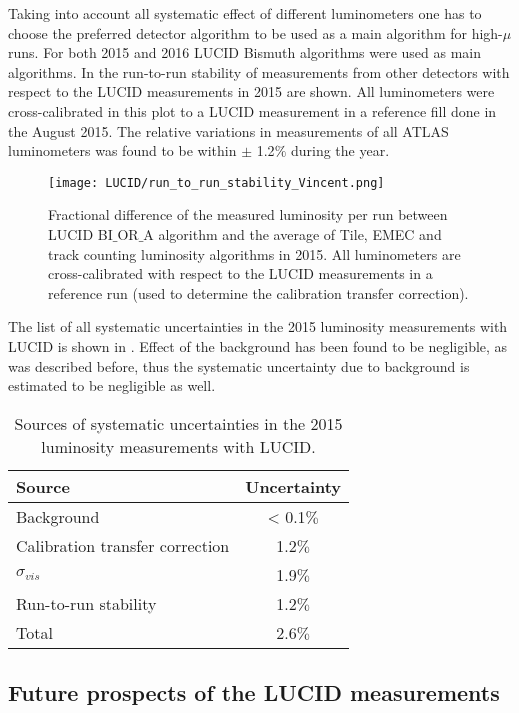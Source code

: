 Taking into account all systematic effect of different luminometers one has to choose the preferred detector algorithm to be used as a main algorithm for high-$\mu$ runs.
For both 2015 and 2016 LUCID Bismuth algorithms were used as main algorithms. 
In  the run-to-run stability of measurements from other detectors with respect to the LUCID measurements in 2015 are shown. 
All luminometers were cross-calibrated in this plot to a LUCID measurement in a reference fill done in the August 2015.
The relative variations in measurements of all ATLAS luminometers was found to be within $\pm$ 1.2$\%$ during the year.
\begin{figure}
\centering
\texttt{[image: LUCID/run\_to\_run\_stability\_Vincent.png]}
\caption{
Fractional difference of the measured luminosity per run between LUCID BI$\_$OR$\_$A algorithm and the average of Tile, EMEC and track counting luminosity algorithms in 2015.
All luminometers are cross-calibrated with respect to the LUCID measurements in a reference run (used to determine the calibration transfer correction).
}
\label{fig:runByRunStability}
\end{figure}

The list of all systematic uncertainties in the 2015 luminosity measurements with LUCID is shown in .
Effect of the background has been found to be negligible, as was described before, thus the systematic uncertainty due to background is estimated to be 
negligible as well.

\begin{table}[bp]
  \begin{tabular}{l|c}
    Source & Uncertainty \\
    \hline
    Background		&	< 0.1$\%$ \\
    \hline
    Calibration transfer correction	&	1.2$\%$ \\
    \hline
    $\sigma_{vis}$	&	1.9$\%$ \\
    \hline
    Run-to-run stability	&	1.2$\%$ \\
    \hline
    \hline
    Total 	&	2.6$\%$ \\
  \end{tabular}
  \caption{Sources of systematic uncertainties in the 2015 luminosity measurements with LUCID.}
  \label{tab:lucid_syst_errors}
\end{table}

\subsection{Future prospects of the LUCID measurements}

